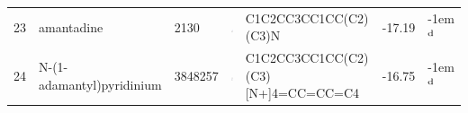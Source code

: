 \documentclass[aps,pre,twocolumn,nofootinbib,superscriptaddress,10pt, final,tightenlines]{revtex4-1}
\begin{document}
\begin{table}
\begin{tabular}{lllp{1.5cm}>{\ttfamily}lS[table-format=-1.2, table-figures-uncertainty=1]l}
23 & amantadine                         & 2130      & \parbox[c]{1em}{\includegraphics[scale=0.2]{figures/2130.pdf}}      & C1C2CC3CC1CC(C2)(C3)N                        & -17.19  & \kern-1em {$^{\rm d}$}  \\
24 & N-(1-adamantyl)pyridinium          & 3848257   & \parbox[c]{1em}{\includegraphics[scale=0.2]{figures/3848257.pdf}}   & C1C2CC3CC1CC(C2)(C3)[N+]4=CC=CC=C4           & -16.75  & \kern-1em {$^{\rm d}$}  \\


\end{tabular}
\end{table}
\end{document}
